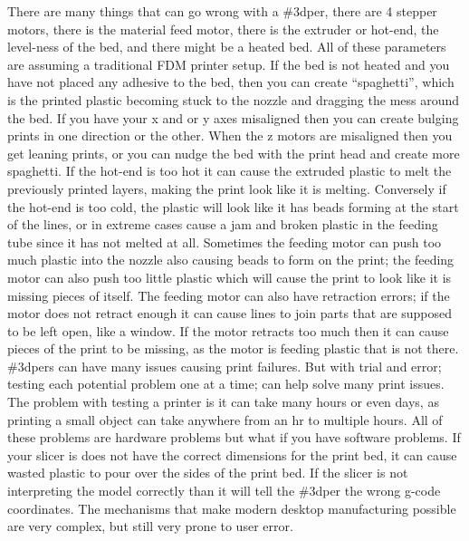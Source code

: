 \documentclass[12pt]{article}
\begin{document}
\begin{flushleft}
There are many things that can go wrong with a \#3dper, there are 4 stepper motors, there is the material feed motor, there is the extruder or hot-end, the level-ness of the bed, and there might be a heated bed. All of these parameters are assuming a traditional FDM printer setup. If the bed is not heated and you have not placed any adhesive to the bed, then you can create ``spaghetti'', which is the printed plastic becoming stuck to the nozzle and dragging the mess around the bed. If you have your x and or y axes misaligned then you can create bulging prints in one direction or the other. When the z motors are misaligned then you get leaning prints, or you can nudge the bed with the print head and create more spaghetti. If the hot-end is too hot it can cause the extruded plastic to melt the previously printed layers, making the print look like it is melting. Conversely if the hot-end is too cold, the plastic will look like it has beads forming at the start of the lines, or in extreme cases cause a jam and broken plastic in the feeding tube since it has not melted at all. Sometimes the feeding motor can push too much plastic into the nozzle also causing beads to form on the print; the feeding motor can also push too little plastic which will cause the print to look like it is missing pieces of itself. The feeding motor can also have retraction errors; if the motor does not retract enough it can cause lines to join parts that are supposed to be left open, like a window. If the motor retracts too much then it can cause pieces of the print to be missing, as the motor is feeding plastic that is not there. \#3dpers can have many issues causing print failures. But with trial and error; testing each potential problem one at a time; can help solve many print issues. The problem with testing a printer is it can take many hours or even days, as printing a small object can take anywhere from an hr to multiple hours. All of these problems are hardware problems but what if you have software problems. If your slicer is does not have the correct dimensions for the print bed, it can cause wasted plastic to pour over the sides of the print bed. If the slicer is not interpreting the model correctly than it will tell the \#3dper the wrong g-code coordinates. The mechanisms that make modern desktop manufacturing possible are very complex, but still very prone to user error.


\end{flushleft}
\end{document}
